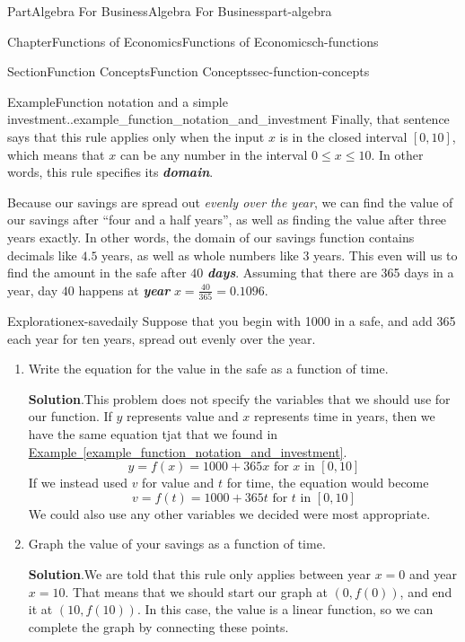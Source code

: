 \documentclass{tufte-book}
\newcommand{\blocktitlefont}{\relax}
\newcommand{\xreffont}{\relax}
\newcommand{\alert}[1]{\textbf{\textit{#1}}}
\numberwithin{equation}{chapter}
\begin{document}
\begin{partptx}{Part}{Algebra For Business}{}{Algebra For Business}{}{}{part-algebra}
\begin{chapterptx}{Chapter}{Functions of Economics}{}{Functions of Economics}{}{}{ch-functions}
\begin{sectionptx}{Section}{Function Concepts}{}{Function Concepts}{}{}{sec-function-concepts}
\begin{example}{Example}{Function notation and a simple investment..}{example_function_notation_and_investment}
Finally, that sentence says that this rule applies only when the input \(x\) is in the closed interval \([0,10]\), which means that \(x\) can be any number in the interval \(0\leq x\leq 10\). In other words, this rule specifies its \alert{domain}.%
\par
Because our savings are spread out \emph{evenly over the year}, we can find the value of our savings after ``four and a half years'', as well as finding the value after three years exactly. In other words, the domain of our savings function contains decimals like \(4.5\) years, as well as whole numbers like \(3\) years. This even will us to find the amount in the safe after \(40\) \alert{days}.  Assuming that there are 365 days in a year, day \(40\) happens at \alert{year} \(x=\frac{40}{365}=0.1096\).%
\end{example}
\begin{exploration}{Exploration}{}{ex-savedaily}%
Suppose that you  begin with \textdollar{}1000 in a safe, and add \textdollar{}365 each year for ten years, spread out evenly over the year.%
\begin{enumerate}[font=\bfseries,label=(\alph*),ref=\alph*]%
\item{}Write the equation for the value in the safe as a function of time.%
\par\smallskip%
\noindent\textbf{\blocktitlefont Solution}.\hypertarget{ex-savedaily-2-2}{}\quad{}This problem does not specify the variables that we should use for our function.  If \(y\) represents value and \(x\) represents time in years, then we have the same equation tjat that we found in \hyperref[example_function_notation_and_investment]{Example~{\xreffont\ref{example_function_notation_and_investment}}}.%
\begin{equation*}
y = f(x) = 1000 + 365 x \text{ for }x\text{ in } [0,10]
\end{equation*}
If we instead used \(v\) for value and \(t\) for time, the equation would become%
\begin{equation*}
v = f(t) = 1000 + 365 t \text{ for }t\text{ in } [0,10]
\end{equation*}
We could also use any other variables we decided were most appropriate.%
\item{}Graph the value of your savings as a function of time.%
\par\smallskip%
\noindent\textbf{\blocktitlefont Solution}.\hypertarget{ex-savedaily-3-2}{}\quad{}We are told that this rule only applies between year \(x=0\) and year \(x=10\). That means that we should start our graph at \((0,f(0))\), and end it at \((10,f(10))\). In this case, the value is a linear function, so we can complete the graph by connecting these points.%

\end{enumerate}
\end{exploration}
\end{sectionptx}
\end{chapterptx}
\end{partptx}
\end{document}
